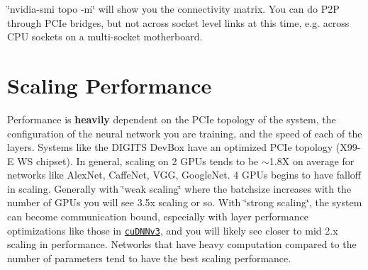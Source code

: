 \char`\"{}nvidia-\/smi topo -\/m\char`\"{} will show you the connectivity matrix. You can do P2P through P\+C\+Ie bridges, but not across socket level links at this time, e.\+g. across C\+PU sockets on a multi-\/socket motherboard.

\section*{Scaling Performance}

Performance is {\bfseries heavily} dependent on the P\+C\+Ie topology of the system, the configuration of the neural network you are training, and the speed of each of the layers. Systems like the D\+I\+G\+I\+TS Dev\+Box have an optimized P\+C\+Ie topology (X99-\/E WS chipset). In general, scaling on 2 G\+P\+Us tends to be $\sim$1.8X on average for networks like Alex\+Net, Caffe\+Net, V\+GG, Google\+Net. 4 G\+P\+Us begins to have falloff in scaling. Generally with \char`\"{}weak scaling\char`\"{} where the batchsize increases with the number of G\+P\+Us you will see 3.\+5x scaling or so. With \char`\"{}strong scaling\char`\"{}, the system can become communication bound, especially with layer performance optimizations like those in \href{http://nvidia.com/cudnn}{\tt cu\+D\+N\+Nv3}, and you will likely see closer to mid 2.\+x scaling in performance. Networks that have heavy computation compared to the number of parameters tend to have the best scaling performance. 